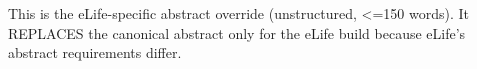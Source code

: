 This is the eLife-specific abstract override (unstructured, <=150 words). It REPLACES the
canonical abstract only for the eLife build because eLife's abstract requirements differ.
